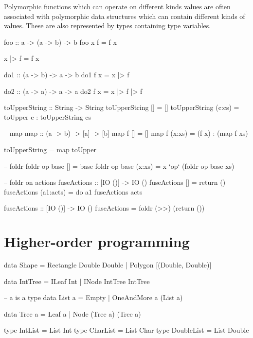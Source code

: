 Polymorphic functions which can operate on different kinds values are often associated with polymorphic 
data structures which can contain different kinds of values. 
These are also represented by types containing type variables.

\begin{haskellcode}
foo :: a -> (a -> b) -> b
foo x f = f x

x |> f = f x

do1 :: (a -> b) -> a -> b
do1 f x = x |> f

do2 :: (a -> a) -> a -> a
do2 f x = x |> f |> f
\end{haskellcode}


\begin{haskellcode}
toUpperString :: String -> String
toUpperString [] = []
toUpperString (c:cs) = toUpper c : toUpperString cs

-- map
map :: (a -> b) -> [a] -> [b]
map f [] = []
map f (x:xs) = (f x) : (map f xs)

toUpperString = map toUpper

-- foldr
foldr op base [] = base
foldr op base (x:xs) = x `op` (foldr op base xs)

-- foldr on actions
fuseActions :: [IO ()] -> IO ()
fuseActions []        = return ()
fuseActions (a1:acts) = do a1
                           fuseActions acts

fuseActions :: [IO ()] -> IO ()
fuseActions = foldr (>>) (return ())
\end{haskellcode}

\section{Higher-order programming} 

\begin{haskellcode}
data Shape  = Rectangle Double Double 
            | Polygon [(Double, Double)]

data IntTree = ILeaf Int
             | INode IntTree IntTree
\end{haskellcode}


\begin{haskellcode}
-- a is a type
data List a = Empty
            | OneAndMore a (List a)

data Tree a = Leaf a
            | Node (Tree a) (Tree a)

type IntList = List Int
type CharList = List Char
type DoubleList = List Double
\end{haskellcode}

